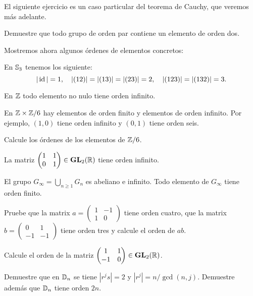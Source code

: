 El siguiente ejercicio es un caso particular del teorema de Cauchy, que veremos más adelante. 

\begin{exercise}
\label{xca:orden2}
Demuestre que todo grupo de orden par contiene un elemento de orden dos. 	
\end{exercise}

Mostremos ahora algunos órdenes de elementos concretos: 

\begin{example}
En $\mathbb{S}_3$ tenemos los siguiente:
\[
|\operatorname{id}|=1,\quad
|(12)|=|(13)|=|(23)|=2,\quad
|(123)|=|(132)|=3.
\]	
\end{example}

\begin{example}
En $\mathbb{Z}$ todo elemento no nulo tiene orden infinito.	
\end{example}

\begin{example}
En $\mathbb{Z}\times\mathbb{Z}/6$ hay elementos de orden finito y elementos de orden infinito. Por ejemplo, $(1,0)$ tiene orden infinito y 
$(0,1)$ tiene orden seis. 
\end{example}

\begin{exercise}
Calcule los órdenes de los elementos de $\mathbb{Z}/6$.	
\end{exercise}

\begin{example}
La matriz $\begin{pmatrix}1&1\\0&1\end{pmatrix}\in\mathbf{GL}_2(\mathbb{R})$ tiene orden infinito. 
\end{example}

\begin{example}
El grupo $G_\infty=\bigcup_{n\geq1}G_n$ es abeliano e infinito. Todo elemento de $G_\infty$ tiene orden finito. 
\end{example}

\begin{exercise}
Pruebe que la matrix $a=\begin{pmatrix}1&-1\\1&0\end{pmatrix}$ tiene orden cuatro, que la matrix $b=\begin{pmatrix}0&1\\-1&-1\end{pmatrix}$ tiene orden tres
y calcule el orden de $ab$.%
\end{exercise}

\begin{exercise}
Calcule el orden de la matriz $\begin{pmatrix}1&1\\-1&0\end{pmatrix}\in\mathbf{GL}_2(\mathbb{R})$. 	
\end{exercise}

\begin{exercise}
Demuestre que en $\mathbb{D}_n$ se tiene $|r^js|=2$ y $|r^j|=n/\gcd(n,j)$. Demuestre además que $\mathbb{D}_n$ tiene orden $2n$. 	
\end{exercise}

